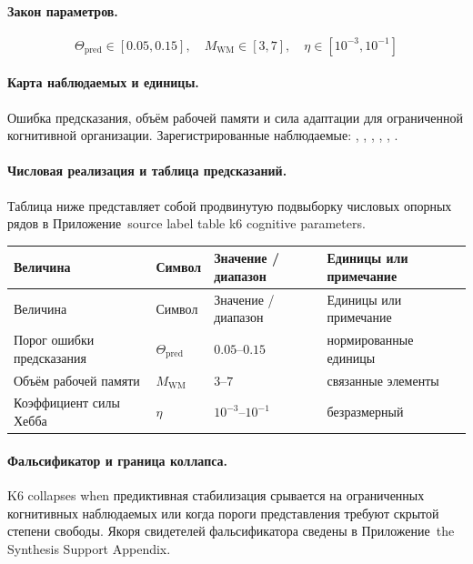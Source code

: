 \paragraph{Закон параметров.}
\[
\Theta_{\mathrm{pred}} \in [0.05,0.15],\quad M_{\mathrm{WM}} \in [3,7],\quad \eta \in [10^{-3},10^{-1}]
\]

\paragraph{Карта наблюдаемых и единицы.}
Ошибка предсказания, объём рабочей памяти и сила адаптации для ограниченной когнитивной организации.
Зарегистрированные наблюдаемые: , \allowbreak {}, \allowbreak {}, \allowbreak {}, \allowbreak {}, \allowbreak {}.

\paragraph{Числовая реализация и таблица предсказаний.}
Таблица ниже представляет собой продвинутую подвыборку числовых опорных рядов в Приложение~source label table k6 cognitive parameters.
\begin{longtable}{@{}L{0.27\textwidth}L{0.15\textwidth}L{0.24\textwidth}L{0.16\textwidth}@{}}
\toprule
Величина & Символ & Значение / диапазон & Единицы или примечание \\
\midrule
\endfirsthead
\toprule
Величина & Символ & Значение / диапазон & Единицы или примечание \\
\midrule
\endhead
Порог ошибки предсказания & $\scriptstyle \Theta_{\mathrm{pred}}$ & $0.05\text{--}0.15$ & нормированные единицы \\
Объём рабочей памяти & $\scriptstyle M_{\mathrm{WM}}$ & $3\text{--}7$ & связанные элементы \\
Коэффициент силы Хебба & $\scriptstyle \eta$ & $10^{-3}\text{--}10^{-1}$ & безразмерный \\
\bottomrule
\end{longtable}

\paragraph{Фальсификатор и граница коллапса.}
K6 collapses when предиктивная стабилизация срывается на ограниченных когнитивных наблюдаемых или когда пороги представления требуют скрытой степени свободы.
Якоря свидетелей фальсификатора сведены в Приложение~the Synthesis Support Appendix.


